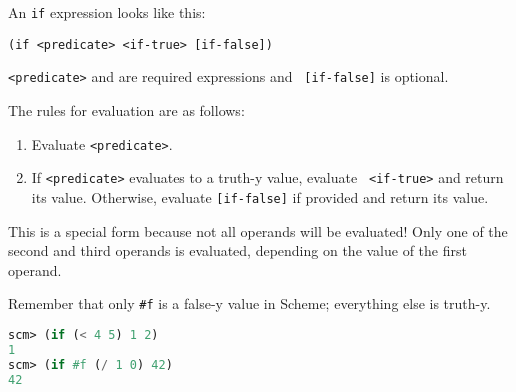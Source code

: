 An
\lstinline$if$ expression looks like this:

\centerline{\lstinline{(if <predicate> <if-true> [if-false])}}

{\tt <predicate>} and {\tt <if-true>} are required expressions and {\tt
[if-false]} is optional.

The rules for evaluation are as follows:
\begin{enumerate}
\item Evaluate {\tt <predicate>}.
\item If {\tt <predicate>} evaluates to a truth-y value, evaluate {\tt
<if-true>} and return its value. Otherwise, evaluate {\tt [if-false]} if
provided and return its value.
\end{enumerate}

This is a special form because not all operands will be evaluated! Only one of
the second and third operands is evaluated, depending on the value of the first
operand.

Remember that only \lstinline{#f} is a false-y value in Scheme; everything else
is truth-y.

\begin{lstlisting}[language=Scheme]
scm> (if (< 4 5) 1 2)
1
scm> (if #f (/ 1 0) 42)
42
\end{lstlisting}
